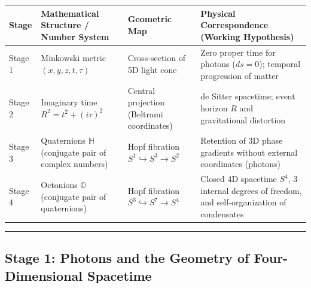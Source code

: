 \documentclass[
  a4paper,
]{article}
\newcounter{none} %
\begin{document}
{\def\LTcaptype{none} %
\begin{longtable}[]{@{}
  >{\raggedright\arraybackslash}p{}
  >{\raggedright\arraybackslash}p{}
  >{\raggedright\arraybackslash}p{}
  >{\raggedright\arraybackslash}p{}@{}}
\toprule\noalign{}
\begin{minipage}[b]{\linewidth}\raggedright
Stage
\end{minipage} & \begin{minipage}[b]{\linewidth}\raggedright
Mathematical Structure / Number System
\end{minipage} & \begin{minipage}[b]{\linewidth}\raggedright
Geometric Map
\end{minipage} & \begin{minipage}[b]{\linewidth}\raggedright
Physical Correspondence (Working Hypothesis)
\end{minipage} \\
\midrule\noalign{}
\endhead
\bottomrule\noalign{}
\endlastfoot
Stage 1 & Minkowski metric \((x,y,z,t,\tau)\) & Cross-section of 5D
light cone & Zero proper time for photons (\(ds=0\)); temporal
progression of matter \\
Stage 2 & Imaginary time \(R^2 = t^2 + (i\tau)^2\) & Central projection
(Beltrami coordinates) & de Sitter spacetime; event horizon \(R\) and
gravitational distortion \\
Stage 3 & Quaternions \(\mathbb{H}\) (conjugate pair of complex numbers)
& Hopf fibration \(S^1 \hookrightarrow S^3 \to S^2\) & Retention of 3D
phase gradients without external coordinates (photons) \\
Stage 4 & Octonions \(\mathbb{O}\) (conjugate pair of quaternions) &
Hopf fibration \(S^3 \hookrightarrow S^7 \to S^4\) & Closed 4D spacetime
\(S^4\), 3 internal degrees of freedom, and self-organization of
condensates \\
\end{longtable}
}

\begin{center}\rule{0.5\linewidth}{0.5pt}\end{center}

\subsection{Stage 1: Photons and the Geometry of Four-Dimensional
Spacetime}\label{stage-1-photons-and-the-geometry-of-four-dimensional-spacetime}
\end{document}
